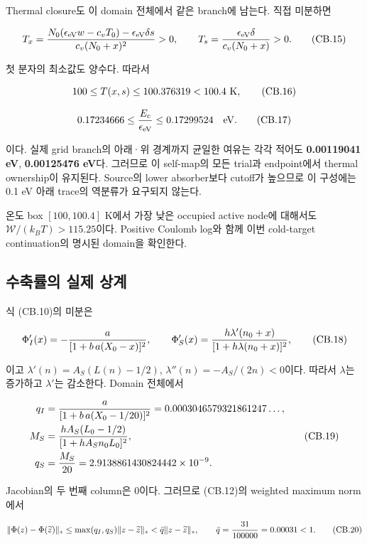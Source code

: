 Thermal closure도 이 domain 전체에서 같은 branch에 남는다. 직접 미분하면

\[
 T_x={N_0(\epsilon_{\rm eV}w-c_vT_0)
                  -\epsilon_{\rm eV}\delta s\over c_v(N_0+x)^2}>0,
 \qquad
 T_s={\epsilon_{\rm eV}\delta\over c_v(N_0+x)}>0.
 \tag{CB.15}
\]

첫 분자의 최소값도 양수다. 따라서

\[
 100\le T(x,s)\le100.376319<100.4\ {\rm K},
 \tag{CB.16}
\]

\[
 0.17234666
 \le {E_c\over\epsilon_{\rm eV}}
 \le0.17299524\quad {\rm eV}.
 \tag{CB.17}
\]

이다. 실제 grid branch의 아래·위 경계까지 균일한 여유는 각각 적어도 \textbf{0.00119041 eV}, \textbf{0.00125476 eV}다. 그러므로 이 self-map의 모든 trial과 endpoint에서 thermal ownership이 유지된다. Source의 lower absorber보다 cutoff가 높으므로 이 구성에는 0.1 eV 아래 trace의 역분류가 요구되지 않는다.

온도 box \([100,100.4]\) K에서 가장 낮은 occupied active node에 대해서도 \(\mathcal W/(k_BT)>115.25\)이다. Positive Coulomb log와 함께 이번 cold-target continuation의 명시된 domain을 확인한다.

\hypertarget{uxc218uxcd95uxb960uxc758-uxc2e4uxc81c-uxc0c1uxacc4}{%
\subsection{수축률의 실제 상계}\label{uxc218uxcd95uxb960uxc758-uxc2e4uxc81c-uxc0c1uxacc4}}

식 (CB.10)의 미분은

\[
 \Phi_I'(x)=-{a\over[1+b\,a(X_0-x)]^2},\qquad
 \Phi_S'(x)={h\lambda'(n_0+x)\over[1+h\lambda(n_0+x)]^2},
 \tag{CB.18}
\]

이고 \(\lambda'(n)=A_S(L(n)-1/2)\), \(\lambda''(n)=-A_S/(2n)<0\)이다. 따라서 \(\lambda\)는 증가하고 \(\lambda'\)는 감소한다. Domain 전체에서

\[
 \begin{aligned}
 q_I&={a\over[1+b\,a(X_0-1/20)]^2}
        =0.0003046579321861247\ldots,\\
 M_S&={h A_S(L_0-1/2)\over[1+h A_S n_0L_0]^2},\\
 q_S&={M_S\over20}=2.9138861430824442\times10^{-9}.
 \end{aligned}\tag{CB.19}
\]

Jacobian의 두 번째 column은 0이다. 그러므로 (CB.12)의 weighted maximum norm에서

\[
 \|\Phi(z)-\Phi(\widetilde z)\|_*
 \le\max(q_I,q_S)\|z-\widetilde z\|_*
 <\bar q\|z-\widetilde z\|_*,\qquad
 \bar q={31\over100000}=0.00031<1.
 \tag{CB.20}
\]


